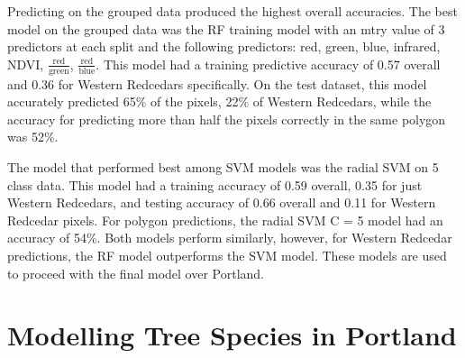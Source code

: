 \documentclass[12pt,twoside]{reedthesis}
\begin{document}
Predicting on the grouped data produced the highest overall accuracies. The best model on the grouped data was the RF training model with an mtry value of 3 predictors at each split and the following predictors: red, green, blue, infrared, NDVI, \(\frac{\mbox{red}}{\mbox{green}}\), \(\frac{\mbox{red}}{\mbox{blue}}\). This model had a training predictive accuracy of 0.57 overall and 0.36 for Western Redcedars specifically. On the test dataset, this model accurately predicted 65\% of the pixels, 22\% of Western Redcedars, while the accuracy for predicting more than half the pixels correctly in the same polygon was 52\%.

The model that performed best among SVM models was the radial SVM on 5 class data. This model had a training accuracy of 0.59 overall, 0.35 for just Western Redcedars, and testing accuracy of 0.66 overall and 0.11 for Western Redcedar pixels. For polygon predictions, the radial SVM C = 5 model had an accuracy of 54\%. Both models perform similarly, however, for Western Redcedar predictions, the RF model outperforms the SVM model. These models are used to proceed with the final model over Portland.

\hypertarget{modelling-tree-species-in-portland}{%
\section{Modelling Tree Species in Portland}\label{modelling-tree-species-in-portland}}
\end{document}
